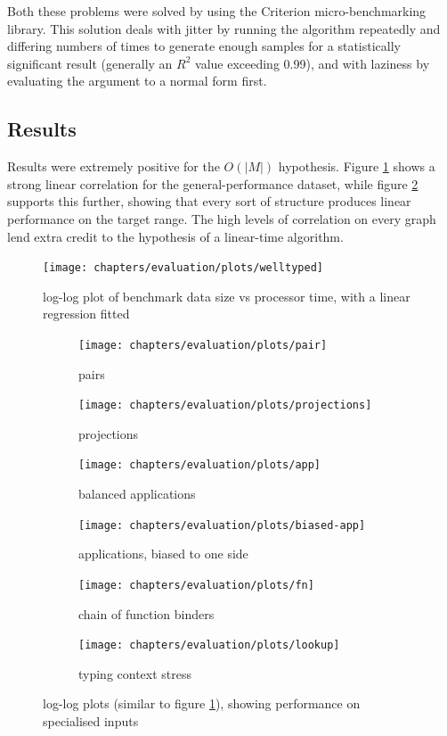 Both these problems were solved by using the Criterion micro-benchmarking library\cite{criterion}.
This solution deals with jitter by running the algorithm repeatedly and differing numbers of times to generate enough samples for a statistically significant result (generally an \(R^2\) value exceeding 0.99), and with laziness by evaluating the argument to a normal form first.

\subsection{Results}
Results were extremely positive for the \(O(|M|)\) hypothesis.
Figure \ref{fig:results-welltyped} shows a strong linear correlation for the general-performance dataset, while figure \ref{fig:results-combined} supports this further, showing that every sort of structure produces linear performance on the target range.
The high levels of correlation on every graph lend extra credit to the hypothesis of a linear-time algorithm.

\begin{figure}
\centering
\texttt{[image: chapters/evaluation/plots/welltyped]}
\caption{log-log plot of benchmark data size vs processor time, with a linear regression fitted}
\label{fig:results-welltyped}
\end{figure}

\begin{figure}
\centering
\begin{subfigure}{.49\textwidth}
 \centering
 \texttt{[image: chapters/evaluation/plots/pair]}
 \caption{pairs}
\end{subfigure}
\begin{subfigure}{.49\textwidth}
 \centering
 \texttt{[image: chapters/evaluation/plots/projections]}
 \caption{projections}
\end{subfigure}
\begin{subfigure}{.49\textwidth}
 \centering
 \texttt{[image: chapters/evaluation/plots/app]}
 \caption{balanced applications}
\end{subfigure}
\begin{subfigure}{.49\textwidth}
 \centering
 \texttt{[image: chapters/evaluation/plots/biased-app]}
 \caption{applications, biased to one side}
\end{subfigure}
\begin{subfigure}{.49\textwidth}
 \centering
 \texttt{[image: chapters/evaluation/plots/fn]}
 \caption{chain of function binders}
\end{subfigure}
\begin{subfigure}{.49\textwidth}
 \centering
 \texttt{[image: chapters/evaluation/plots/lookup]}
 \caption{typing context stress}
\end{subfigure}
\caption{log-log plots (similar to figure \ref{fig:results-welltyped}), showing performance on specialised inputs}
\label{fig:results-combined}
\end{figure}

